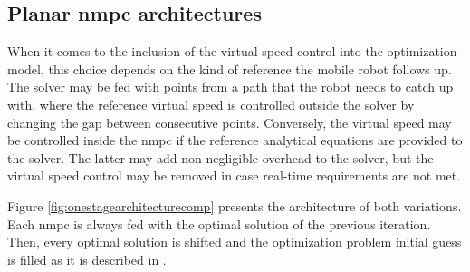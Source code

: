 \subsection{Planar \acrshort{nmpc} architectures}
\label{subsection:onestageocparch}

When it comes to the inclusion of the virtual speed control into the optimization model, this choice depends on the kind of reference the mobile robot follows up. The solver may be fed with points from a path that the robot needs to catch up with, where the reference virtual speed is controlled outside the solver by changing the gap between consecutive points. Conversely, the virtual speed may be controlled inside the \acrshort{nmpc} if the reference analytical equations are provided to the solver. The latter may add non-negligible overhead to the solver, but the virtual speed control may be removed in case real-time requirements are not met.

Figure \ref{fig:onestagearchitecturecomp} presents the architecture of both variations. Each \acrshort{nmpc} is always fed with the optimal solution of the previous iteration. Then, every optimal solution is shifted and the optimization problem initial guess is filled as it is described in .

